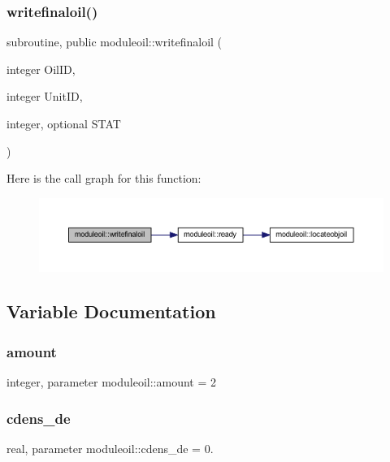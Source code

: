 \subsubsection{\texorpdfstring{writefinaloil()}{writefinaloil()}}
{\footnotesize\ttfamily subroutine, public moduleoil\+::writefinaloil (\begin{DoxyParamCaption}\item[{integer}]{Oil\+ID,  }\item[{integer}]{Unit\+ID,  }\item[{integer, optional}]{S\+T\+AT }\end{DoxyParamCaption})}

Here is the call graph for this function\+:\nopagebreak
\begin{figure}[H]
\begin{center}
\leavevmode
\includegraphics[width=350pt]{namespacemoduleoil_afaa341d33088f674ca74e6ac763daa2d_cgraph}
\end{center}
\end{figure}


\subsection{Variable Documentation}
\mbox{\label{namespacemoduleoil_a648f61975720c552bfe6573b095ffa9e}} 
\subsubsection{\texorpdfstring{amount}{amount}}
{\footnotesize\ttfamily integer, parameter moduleoil\+::amount = 2\hspace{0.3cm}{\ttfamily [private]}}

\mbox{\label{namespacemoduleoil_abdd514937ab9c47037f4547fd9228fad}} 
\subsubsection{\texorpdfstring{cdens\+\_\+de}{cdens\_de}}
{\footnotesize\ttfamily real, parameter moduleoil\+::cdens\+\_\+de = 0.\hspace{0.3cm}{\ttfamily [private]}}

